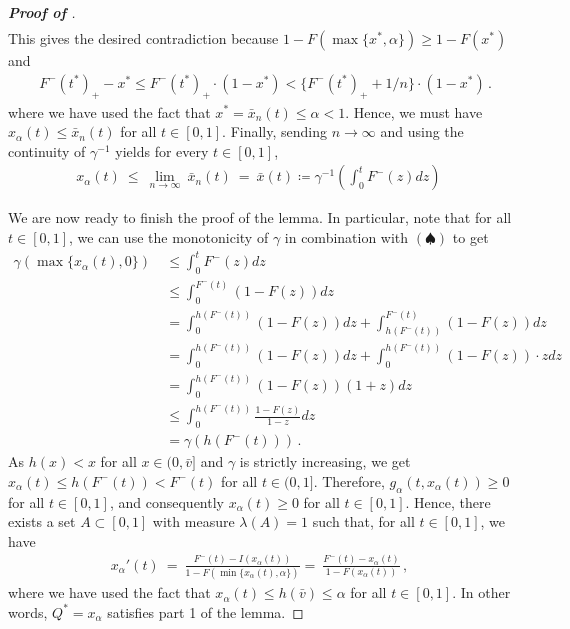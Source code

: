 \begin{proof}[\textbf{Proof of }]
\begin{align*}
	\end{align*}
	This gives the desired contradiction because $1 - F(\max\{x^*, \alpha\}) \geq 1 - F(x^*)$ and
	\begin{align*}
		&F^-(t^*)_+ - x^* \leq F^-(t^*)_+ \cdot (1 - x^*) <  \{F^-(t^*)_+ + 1/n\} \cdot  (1 -  x^*)\,.
	\end{align*}
    where we have used the fact that $x^* = \bar x_n(t) \leq \alpha < 1$. Hence, we must have $x_\alpha(t) \leq \bar x_n(t)$ for all $t \in [0,1]$. Finally, sending $n \to \infty$ and using the continuity of $\gamma^{-1}$ yields for every $t \in [0,1]$,
	\begin{align*}
		x_\alpha(t)\ \leq\ \lim_{n \to \infty}\ \bar x_n(t)\ =\ \bar x(t) \coloneqq \gamma^{-1}\left( \int_0^t F^-(z) dz \right)\, \tag{$\spadesuit$}
	\end{align*}
	

    We are now ready to finish the proof of the lemma. In particular, note that for all $t \in [0,1]$, we can use the monotonicity of $\gamma$ in combination with $(\spadesuit)$ to get
	\begin{align*}
		\gamma(\max\{x_\alpha(t), 0\})\ &\leq \int_0^t F^-(z) dz\\ 
		&\leq \int_0^{F^-(t)} (1 - F(z))dz\\ 
		&= \int_0^{h(F^-(t))} (1 - F(z))dz + \int_{h(F^-(t))}^{F^-(t)} (1 - F(z))dz\\
		&= \int_0^{h(F^-(t))} (1 - F(z))dz + \int_0^{h(F^-(t))} (1 - F(z))\cdot z dz\\
		&= \int_0^{h(F^-(t))} (1 - F(z))(1 + z)dz\\
		&\leq \int_0^{h(F^-(t))} \frac{1 - F(z)}{1 - z}dz\\
		&= \gamma(h(F^-(t)))\,.
	\end{align*}
	As $h(x) < x$ for all $x \in (0,\bar v]$ and $\gamma$ is strictly increasing, we get $x_\alpha(t) \leq h(F^-(t)) < F^-(t)$ for all $t \in (0,1]$. Therefore, $g_\alpha(t, x_\alpha(t)) \geq 0$ for all $t \in [0,1]$, and consequently $x_\alpha(t) \geq 0$ for all $t \in [0,1]$. Hence, there exists a set $A\subset [0,1]$ with measure $\lambda(A) = 1$ such that, for all $t \in [0,1]$, we have
	\begin{align*}
		x_\alpha'(t)\ =\ \frac{F^-(t) - I(x_\alpha(t))}{1 - F(\min\{x_\alpha(t), \alpha\})} =\ \frac{F^-(t) - x_\alpha(t)}{1 - F(x_\alpha(t))}\,,
	\end{align*}
	where we have used the fact that $x_\alpha(t) \leq h(\bar v) \leq \alpha$ for all $t \in [0,1]$. In other words, $Q^* = x_\alpha$ satisfies part 1 of the lemma.
	

\end{proof}
